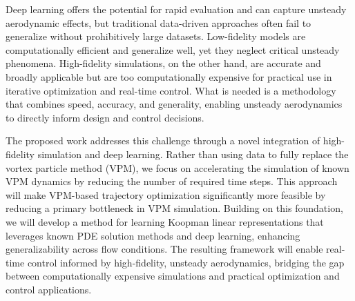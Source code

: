 \documentclass[12pt, letterpaper]{article}
\begin{document}
Deep learning offers the potential for rapid evaluation and can capture unsteady aerodynamic effects, but traditional data-driven approaches often fail to generalize without prohibitively large datasets. Low-fidelity models are computationally efficient and generalize well, yet they neglect critical unsteady phenomena. High-fidelity simulations, on the other hand, are accurate and broadly applicable but are too computationally expensive for practical use in iterative optimization and real-time control. What is needed is a methodology that combines speed, accuracy, and generality, enabling unsteady aerodynamics to directly inform design and control decisions.

The proposed work addresses this challenge through a novel integration of high-fidelity simulation and deep learning. Rather than using data to fully replace the vortex particle method (VPM), we focus on accelerating the simulation of known VPM dynamics by reducing the number of required time steps. This approach will make VPM-based trajectory optimization significantly more feasible by reducing a primary bottleneck in VPM simulation. Building on this foundation, we will develop a method for learning Koopman linear representations that leverages known PDE solution methods and deep learning, enhancing generalizability across flow conditions. The resulting framework will enable real-time control informed by high-fidelity, unsteady aerodynamics, bridging the gap between computationally expensive simulations and practical optimization and control applications.
\end{document}
